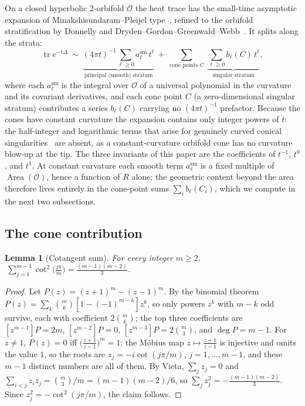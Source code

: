 \documentclass[12pt, letterpaper]{article}
\theoremstyle{definition}
\theoremstyle{plain}
\newtheorem{lemma}[theorem]{Lemma}
\begin{document}
On a closed hyperbolic $2$-orbifold $\mathcal{O}$ the heat trace has the small-time asymptotic expansion of Minakshisundaram--Pleijel type~\cite{mckeansinger1967}, refined to the orbifold stratification by Donnelly and Dryden--Gordon--Greenwald--Webb~\cite{donnelly1976, dggw2008}. It splits along the strata:
\[
    \operatorname{tr}e^{-t\Delta}\ \sim\ \underbrace{(4\pi t)^{-1}\sum_{\ell\ge0} a^{\mathrm{sm}}_\ell\, t^{\ell}}_{\text{principal (smooth) stratum}}\ +\ \sum_{\text{cone points }C}\ \underbrace{\sum_{\ell\ge0} b_\ell(C)\, t^{\ell}}_{\text{singular stratum}},
\]
where each $a^{\mathrm{sm}}_\ell$ is the integral over $\mathcal{O}$ of a universal polynomial in the curvature and its covariant derivatives, and each cone point $C$ (a zero-dimensional singular stratum) contributes a series $b_\ell(C)$ carrying no $(4\pi t)^{-1}$ prefactor. Because the cones have constant curvature the expansion contains only integer powers of $t$: the half-integer and logarithmic terms that arise for genuinely curved conical singularities~\cite{schueth2025, suleymanova2017, nrs2024} are absent, as a constant-curvature orbifold cone has no curvature blow-up at the tip. The three invariants of this paper are the coefficients of $t^{-1}$, $t^{0}$, and $t^{1}$. At constant curvature each smooth term $a^{\mathrm{sm}}_\ell$ is a fixed multiple of $\operatorname{Area}(\mathcal{O})$, hence a function of $R$ alone; the geometric content beyond the area therefore lives entirely in the cone-point sums $\sum_i b_\ell(C_i)$, which we compute in the next two subsections.

\subsection{The cone contribution}
\label{sec:cone}

\begin{lemma}[Cotangent sum]\label{lem:cot}
For every integer $m\ge2$, $\ \displaystyle\sum_{j=1}^{m-1}\cot^2\!\Big(\tfrac{j\pi}{m}\Big)=\tfrac{(m-1)(m-2)}{3}$.
\end{lemma}

\begin{proof}
Let $P(z)=(z+1)^m-(z-1)^m$. By the binomial theorem $P(z)=\sum_k\binom{m}{k}[1-(-1)^{m-k}]z^k$, so only powers $z^k$ with $m-k$ odd survive, each with coefficient $2\binom{m}{k}$; the top three coefficients are $[z^{m-1}]P=2m$, $[z^{m-2}]P=0$, $[z^{m-3}]P=2\binom{m}{3}$, and $\deg P=m-1$. For $z\ne1$, $P(z)=0$ iff $\big(\tfrac{z+1}{z-1}\big)^m=1$; the M\"obius map $z\mapsto\tfrac{z+1}{z-1}$ is injective and omits the value $1$, so the roots are $z_j=-i\cot(j\pi/m)$, $j=1,\dots,m-1$, and these $m-1$ distinct numbers are all of them. By Vieta, $\sum_j z_j=0$ and $\sum_{i<j}z_iz_j=\binom{m}{3}/m=(m-1)(m-2)/6$, so $\sum_j z_j^2=-\tfrac{(m-1)(m-2)}{3}$. Since $z_j^2=-\cot^2(j\pi/m)$, the claim follows.
\end{proof}
\end{document}
